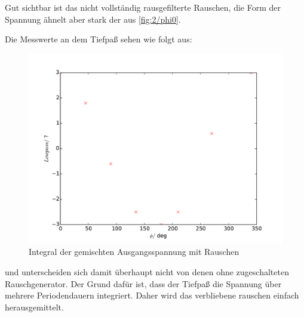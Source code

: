 Gut sichtbar ist das nicht vollständig rausgefilterte Rauschen, die Form der
Spannung ähnelt aber stark der aus \ref{fig:2/phi0}.

Die Messwerte an dem Tiefpaß sehen wie folgt aus:

\begin{figure}
  \centering
  \includegraphics[width=\textwidth]{plot3low.pdf}
  \caption{Integral der gemischten Ausgangsspannung mit Rauschen}
  \label{fig:plot3low}
\end{figure}

und unterscheiden sich damit überhaupt nicht von denen ohne zugeschalteten
Rauschgenerator. Der Grund dafür ist, dass der Tiefpaß die Spannung über mehrere
Periodendauern integriert. Daher wird das verbliebene rauschen einfach
herausgemittelt.

